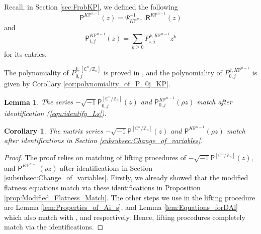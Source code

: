 \documentclass[12pt]{amsart}
\newtheorem{lem}[prop]{Lemma}
\newtheorem{cor}[prop]{Corollary}
\numberwithin{equation}{section}
\newcommand{\CnZn}{[\mathbb{C}^n/\mathbb{Z}_n]}
\newcommand{\KP}{K\mathbb{P}}
\begin{document}
Recall, in Section \ref{sec:FrobKP}, we defined the following $$\mathsf{P}^{\KP^{n-1}}(z)=\Psi^{-1}_{\KP^{n-1}}{\mathsf{R}}^{\KP^{n-1}}(z)$$
and $$\mathsf{P}_{i,j}^{\KP^{n-1}}(z)=\sum_{k\geq{0}}P_{i,j}^{k,\KP^{n-1}}z^k$$
for its entries.  

The polynomiality of $P_{0,j}^{k,\CnZn}$ is proved in \cite{gt}, and the polynomiality of $P_{0,j}^{k,\KP^{n-1}}$ is given by Corollary \ref{cor:polynomiality_of_P_0j_KP}.

\begin{lem}\label{lem:mathcing_of_P0jzs}
The series $-\sqrt{-1}\mathsf{P}^{\CnZn}_{0,j}(z)$ and $\mathsf{P}^{\KP^{n-1}}_{0,j}({\rho}z)$ match after identification (\ref{eqn:identify_Ls}).
\end{lem}

\begin{cor}
The matrix series $-\sqrt{-1}\mathsf{P}^{\CnZn}(z)$ and $\mathsf{P}^{\KP^{n-1}}({\rho}z)$ match after identifications in Section \ref{subsubsec:Change_of_variables}. 
\end{cor} 

\begin{proof}
The proof relies on matching of lifting procedures of $-\sqrt{-1}\mathsf{P}^{\CnZn}(z)$, and $\mathsf{P}^{\KP^{n-1}}({\rho}z)$ after identifications in Section \ref{subsubsec:Change_of_variables}. Firstly, we already showed that the modified flatness equations match via these identifications in Proposition \ref{prop:Modified_Flatness_Match}. The other steps we use in the lifting procedure are  Lemma \ref{lem:Properties_of_Ai_s}, and Lemma  \ref{lem:Equations_forDAl} which also match with \cite[Lemma 2.8]{gt}, and \cite[Lemma 2.10]{gt} respectively. Hence, lifting procedures completely match via the identifications.
\end{proof}
\end{document}
